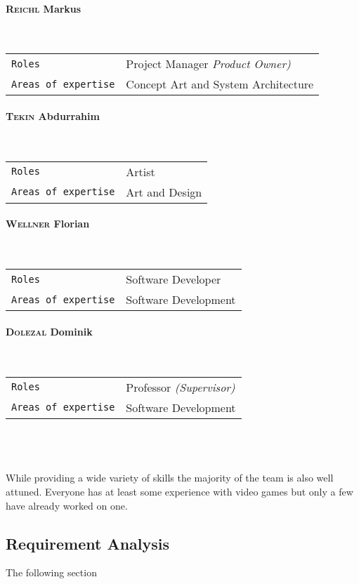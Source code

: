 \documentclass[11pt]{article}
\begin{document}
\paragraph{\textsc{Reichl} Markus} ~\\
\begin{tabular}{ll}
\texttt{Roles} & Project Manager \textit{\small{Product Owner)}}\\
\texttt{Areas of expertise} & Concept Art and System Architecture
\end{tabular}
\paragraph{\textsc{Tekin} Abdurrahim} ~\\
\begin{tabular}{ll}
\texttt{Roles} & Artist\\
\texttt{Areas of expertise} & Art and Design
\end{tabular}
\paragraph{\textsc{Wellner} Florian} ~\\
\begin{tabular}{ll}
\texttt{Roles} & Software Developer\\
\texttt{Areas of expertise} & Software Development
\end{tabular}
\paragraph{\textsc{Dolezal} Dominik} ~\\
\begin{tabular}{ll}
\texttt{Roles} & Professor \textit{\small{(Supervisor)}}\\
\texttt{Areas of expertise} & Software Development
\end{tabular}
\\
\\
\\
While providing a wide variety of skills the majority of the team is also well attuned. Everyone has at least some experience with video games but only a few have already worked on one.

\subsection{Requirement Analysis}
The following section
\end{document}
